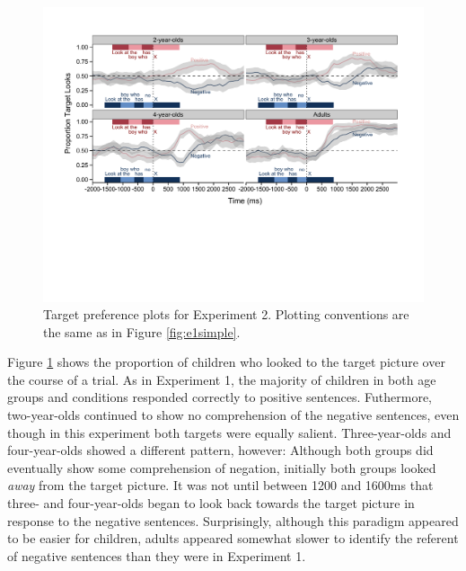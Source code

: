 \documentclass[man]{apa2}
\begin{document}
\begin{figure}
\begin{center} 
\includegraphics[width=6in]{simpleplots_something.pdf}
\caption{\label{fig:e2simple} Target preference plots for Experiment 2. Plotting conventions are the same as in Figure \ref{fig:e1simple}.}
\end{center} 
\end{figure}

Figure \ref{fig:e2simple} shows the proportion of children who looked to the target picture over the course of a trial.  As in Experiment 1, the majority of children in both age groups and conditions responded correctly to positive sentences.  Futhermore, two-year-olds continued to show no comprehension of the negative sentences, even though in this experiment both targets were equally salient.  Three-year-olds and four-year-olds showed a different pattern, however: Although both groups did eventually show some comprehension of negation, initially both groups looked \emph{away} from the target picture.  It was not until between 1200 and 1600ms that three- and four-year-olds began to look back towards the target picture in response to the negative sentences. Surprisingly, although this paradigm appeared to be easier for children, adults appeared somewhat slower to identify the referent of negative sentences than they were in Experiment 1.  
\end{document}
